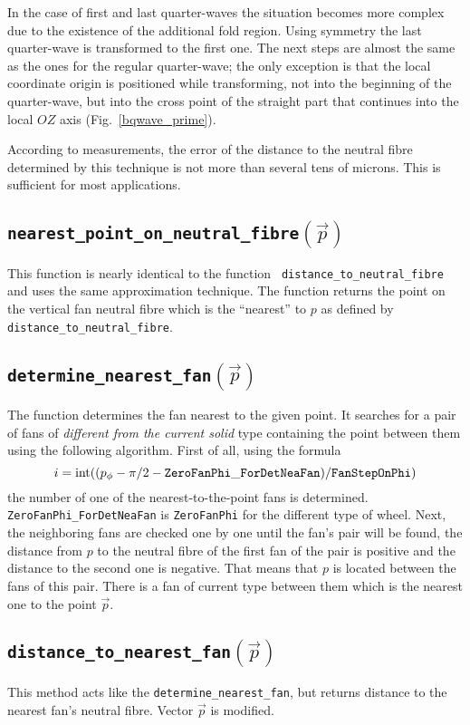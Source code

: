 \documentclass{article}
\begin{document}


In the case of first and last quarter-waves the situation becomes more complex
due to
the existence of the additional fold region.
Using symmetry the last quarter-wave is transformed to the first one.
The next steps are almost the same as the ones for the regular quarter-wave;
the only
exception is that the local coordinate origin is positioned while transforming, not
into
the beginning of the quarter-wave, but into the cross point of the straight part
that continues into the local $OZ$ axis (Fig.~\ref{bqwave_prime}). 

According to measurements, the error of the
distance to the neutral fibre determined by this technique is not more
 than several tens of
microns. This is sufficient for most applications.

\subsection{\tt nearest\_point\_on\_neutral\_fibre$(\vec{p})$}
This function is nearly identical to the function {\tt
distance\_to\_neutral\_fibre}
and uses the same approximation technique.
 The function returns the point on the
vertical fan neutral fibre which is the ``nearest'' to $p$ as defined by {\tt
distance\_to\_neutral\_fibre}.

\subsection{\tt determine\_nearest\_fan$(\vec{p})$}\label{det_nea_fan}
The function determines the fan nearest to the given point.
It searches for a pair of fans of {\em different from the current solid} type
containing the point between them using the following algorithm.
First of all, using the formula
\[i = \mbox{int}((p_{\phi} - \pi/2 - {\tt ZeroFanPhi\_ForDetNeaFan}) /
{\tt FanStepOnPhi})\] 
the number of one of the nearest-to-the-point fans is determined. {\tt
ZeroFanPhi\_ForDetNeaFan} is {\tt ZeroFanPhi} for the different type of wheel.
Next, the neighboring fans are checked one by one until the fan's pair will be
found, the distance from $p$ to the neutral fibre of the first fan of the pair
is positive and the distance to the second one is negative.
That means that $p$ is located between the fans of this pair. There is a fan of
current type between them which is the nearest one to the point $\vec{p}$.

\subsection{\tt distance\_to\_nearest\_fan$(\vec{p})$}
This method acts
 like the {\tt determine\_nearest\_fan}, but returns distance to the nearest
fan's neutral fibre. Vector $\vec{p}$ is modified.
\end{document}
